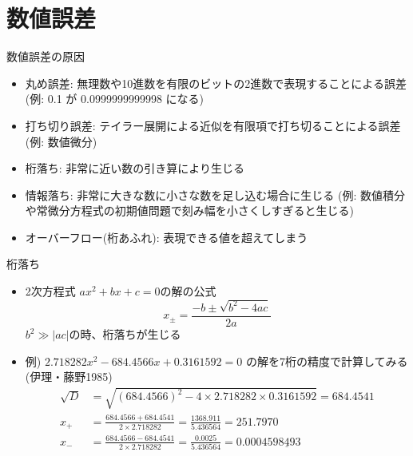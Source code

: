 \documentclass[dvipdfmx]{beamer}
\begin{document}
\section{数値誤差}

\begin{frame}[t,fragile]{数値誤差の原因}
  \begin{itemize}
    \setlength{\itemsep}{1em}
  \item 丸め誤差: 無理数や10進数を有限のビットの2進数で表現することによる誤差
    (例: 0.1 が 0.0999999999998 になる)
  \item 打ち切り誤差: テイラー展開による近似を有限項で打ち切ることによる誤差
    (例: 数値微分)
  \item 桁落ち: 非常に近い数の引き算により生じる
  \item 情報落ち: 非常に大きな数に小さな数を足し込む場合に生じる
    (例: 数値積分や常微分方程式の初期値問題で刻み幅を小さくしすぎると生じる)
  \item オーバーフロー(桁あふれ): 表現できる値を超えてしまう
  \end{itemize}
\end{frame}

\begin{frame}[t,fragile]{桁落ち}
  \begin{itemize}
    \setlength{\itemsep}{1em}
  \item 2次方程式 $ax^2+bx+c=0$の解の公式
    \[
    x_{\pm} = \frac{-b \pm \sqrt{b^2-4ac}}{2a}
    \]
    $b^2 \gg |ac|$の時、桁落ちが生じる
  \item 例) $2.718282x^2 - 684.4566x+0.3161592=0$ の解を7桁の精度で計算してみる(伊理・藤野1985)
    \begin{align*}
      \sqrt{D} &= \sqrt{(684.4566)^2 - 4 \times 2.718282 \times 0.3161592} = 684.4541 \\
      x_+ &= \frac{684.4566+684.4541}{2 \times 2.718282} = \frac{1368.911}{5.436564} = 251.7970 \\
      x_- &= \frac{684.4566-684.4541}{2 \times 2.718282} = \frac{0.0025}{5.436564} = 0.00045\underline{98493}
    \end{align*}
  \end{itemize}
\end{frame}
\end{document}

